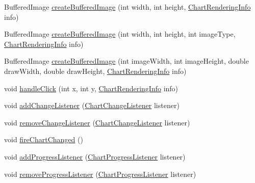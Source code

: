 \begin{DoxyCompactItemize}
\item 
Buffered\+Image \mbox{\hyperlink{classorg_1_1jfree_1_1chart_1_1_j_free_chart_a2938e93cd09e7ba9d1a3f31fc8fc7647}{create\+Buffered\+Image}} (int width, int height, \mbox{\hyperlink{classorg_1_1jfree_1_1chart_1_1_chart_rendering_info}{Chart\+Rendering\+Info}} info)
\item 
Buffered\+Image \mbox{\hyperlink{classorg_1_1jfree_1_1chart_1_1_j_free_chart_aaf24e892fc9231e92c4ff1726767ea7c}{create\+Buffered\+Image}} (int width, int height, int image\+Type, \mbox{\hyperlink{classorg_1_1jfree_1_1chart_1_1_chart_rendering_info}{Chart\+Rendering\+Info}} info)
\item 
Buffered\+Image \mbox{\hyperlink{classorg_1_1jfree_1_1chart_1_1_j_free_chart_a7c1a268890b1ac44b93b19ec7e28eb9d}{create\+Buffered\+Image}} (int image\+Width, int image\+Height, double draw\+Width, double draw\+Height, \mbox{\hyperlink{classorg_1_1jfree_1_1chart_1_1_chart_rendering_info}{Chart\+Rendering\+Info}} info)
\item 
void \mbox{\hyperlink{classorg_1_1jfree_1_1chart_1_1_j_free_chart_a7870690efb02817a536123b453f90116}{handle\+Click}} (int x, int y, \mbox{\hyperlink{classorg_1_1jfree_1_1chart_1_1_chart_rendering_info}{Chart\+Rendering\+Info}} info)
\item 
void \mbox{\hyperlink{classorg_1_1jfree_1_1chart_1_1_j_free_chart_a675caacf5e368015181026f6acb3e8c7}{add\+Change\+Listener}} (\mbox{\hyperlink{interfaceorg_1_1jfree_1_1chart_1_1event_1_1_chart_change_listener}{Chart\+Change\+Listener}} listener)
\item 
void \mbox{\hyperlink{classorg_1_1jfree_1_1chart_1_1_j_free_chart_ab975fd93d4df150231ac1e413bae9c33}{remove\+Change\+Listener}} (\mbox{\hyperlink{interfaceorg_1_1jfree_1_1chart_1_1event_1_1_chart_change_listener}{Chart\+Change\+Listener}} listener)
\item 
void \mbox{\hyperlink{classorg_1_1jfree_1_1chart_1_1_j_free_chart_a807d5bd946841ffa05591253d7332830}{fire\+Chart\+Changed}} ()
\item 
void \mbox{\hyperlink{classorg_1_1jfree_1_1chart_1_1_j_free_chart_a01fa8b4979ad1166520db31d94b99eb1}{add\+Progress\+Listener}} (\mbox{\hyperlink{interfaceorg_1_1jfree_1_1chart_1_1event_1_1_chart_progress_listener}{Chart\+Progress\+Listener}} listener)
\item 
void \mbox{\hyperlink{classorg_1_1jfree_1_1chart_1_1_j_free_chart_a4e49f1c4b7ed4328f29cac2c6a4f5a09}{remove\+Progress\+Listener}} (\mbox{\hyperlink{interfaceorg_1_1jfree_1_1chart_1_1event_1_1_chart_progress_listener}{Chart\+Progress\+Listener}} listener)

\end{DoxyCompactItemize}
